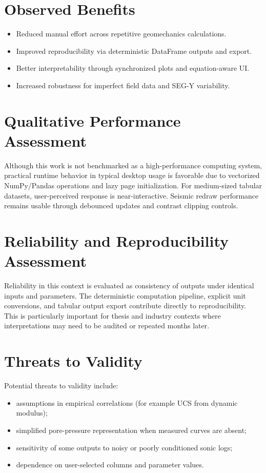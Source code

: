 \documentclass[12pt,a4paper]{report}
\begin{document}
\section{Observed Benefits}
\begin{itemize}
    \item Reduced manual effort across repetitive geomechanics calculations.
    \item Improved reproducibility via deterministic DataFrame outputs and export.
    \item Better interpretability through synchronized plots and equation-aware UI.
    \item Increased robustness for imperfect field data and SEG-Y variability.
\end{itemize}

\section{Qualitative Performance Assessment}
Although this work is not benchmarked as a high-performance computing system, practical runtime behavior in typical desktop usage is favorable due to vectorized NumPy/Pandas operations and lazy page initialization. For medium-sized tabular datasets, user-perceived response is near-interactive. Seismic redraw performance remains usable through debounced updates and contrast clipping controls.

\section{Reliability and Reproducibility Assessment}
Reliability in this context is evaluated as consistency of outputs under identical inputs and parameters. The deterministic computation pipeline, explicit unit conversions, and tabular output export contribute directly to reproducibility. This is particularly important for thesis and industry contexts where interpretations may need to be audited or repeated months later.

\section{Threats to Validity}
Potential threats to validity include:
\begin{itemize}
    \item assumptions in empirical correlations (for example UCS from dynamic modulus);
    \item simplified pore-pressure representation when measured curves are absent;
    \item sensitivity of some outputs to noisy or poorly conditioned sonic logs;
    \item dependence on user-selected columns and parameter values.
\end{itemize}
\end{document}
